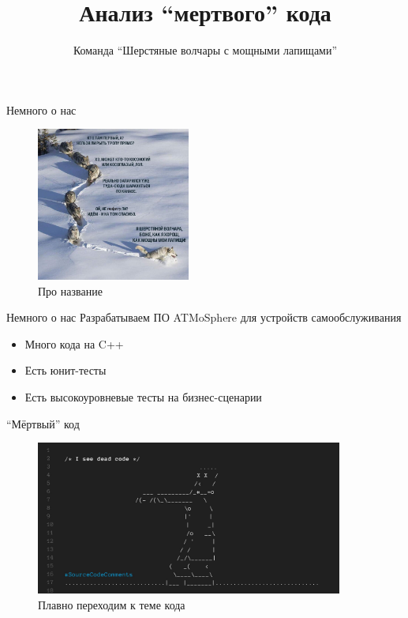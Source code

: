 \documentclass[aspectratio=169]{beamer}
\title{Анализ ``мертвого'' кода}
\author{Команда ``Шерстяные волчары с мощными лапищами''}
\newcommand{\myskip}{\vspace{\baselineskip}}
\begin{document}
\begin{frame}
    \titlepage
\end{frame}

\begin{frame}{Немного о нас}
    \begin{figure}
        \includegraphics[width=0.45\textwidth]{memes/volf.jpg}
        \caption{Про название}
    \end{figure}
\end{frame}

\begin{frame}{Немного о нас}
    Разрабатываем ПО ATMoSphere для устройств самообслуживания
    \begin{itemize}
        \item Много кода на C++
        \item Есть юнит-тесты
        \item Есть высокоуровневые тесты на бизнес-сценарии
    \end{itemize}
    \myskip
\end{frame}

\begin{frame}{``Мёртвый'' код}
    \begin{figure}
        \includegraphics[width=0.9\textwidth]{memes/dead_code.jpg}
        \caption{Плавно переходим к теме кода}
    \end{figure}
\end{frame}
\end{document}
